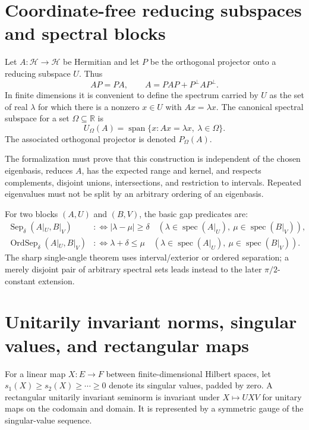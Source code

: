 \documentclass[11pt]{article}
\newcommand{\Hh}{\mathcal H}
\newcommand{\spec}{\operatorname{spec}}
\newcommand{\abs}[1]{\left|#1\right|}
\theoremstyle{remark}
\begin{document}
\section{Coordinate-free reducing subspaces and spectral blocks}

Let \(A:\Hh\to\Hh\) be Hermitian and let \(P\) be the orthogonal projector
onto a reducing subspace \(U\).  Thus
\[
  AP=PA, \qquad A=PAP+P^\perp A P^\perp.
\]
In finite dimensions it is convenient to define the spectrum carried by
\(U\) as the set of real \(\lambda\) for which there is a nonzero
\(x\in U\) with \(Ax=\lambda x\).  The canonical spectral subspace for a set
\(\Omega\subseteq\mathbb R\) is
\[
  U_\Omega(A)=\operatorname{span}\{x:Ax=\lambda x,\ \lambda\in\Omega\}.
\]
The associated orthogonal projector is denoted \(P_\Omega(A)\).

The formalization must prove that this construction is independent of the
chosen eigenbasis, reduces \(A\), has the expected range and kernel, and
respects complements, disjoint unions, intersections, and restriction to
intervals.  Repeated eigenvalues must not be split by an arbitrary ordering of
an eigenbasis.

For two blocks \((A,U)\) and \((B,V)\), the basic gap predicates are:
\begin{align*}
  \operatorname{Sep}_\delta(A|_U,B|_V)
    &:\Longleftrightarrow
      \abs{\lambda-\mu}\ge\delta
      \quad(\lambda\in\spec(A|_U),\ \mu\in\spec(B|_V)),\\
  \operatorname{OrdSep}_\delta(A|_U,B|_V)
    &:\Longleftrightarrow
      \lambda+\delta\le\mu
      \quad(\lambda\in\spec(A|_U),\ \mu\in\spec(B|_V)).
\end{align*}
The sharp single-angle theorem uses interval/exterior or ordered separation;
a merely disjoint pair of arbitrary spectral sets leads instead to the later
\(\pi/2\)-constant extension.

\section{Unitarily invariant norms, singular values, and rectangular maps}

For a linear map \(X:E\to F\) between finite-dimensional Hilbert spaces, let
\(s_1(X)\ge s_2(X)\ge\cdots\ge0\) denote its singular values, padded by zero.
A rectangular unitarily invariant seminorm is invariant under
\(X\mapsto UXV\) for unitary maps on the codomain and domain.  It is represented
by a symmetric gauge of the singular-value sequence.
\end{document}
